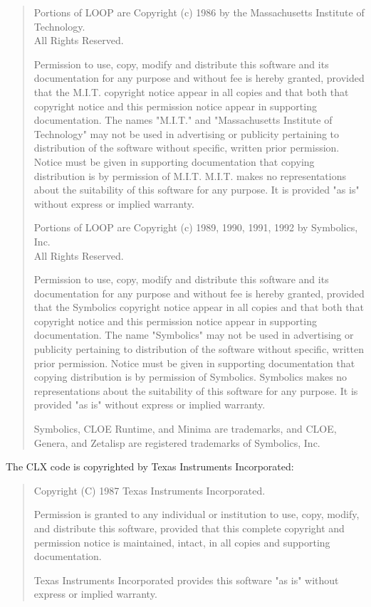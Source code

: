 \begin{quotation}
\noindent Portions of LOOP are Copyright (c) 1986 by the Massachusetts
Institute of Technology.\\
All Rights Reserved.

\vspace{1ex}
\noindent Permission to use, copy, modify and distribute this software
and its documentation for any purpose and without fee is hereby granted,
provided that the M.I.T. copyright notice appear in all copies and that
both that copyright notice and this permission notice appear in
supporting documentation.  The names "M.I.T." and "Massachusetts
Institute of Technology" may not be used in advertising or publicity
pertaining to distribution of the software without specific, written
prior permission.  Notice must be given in supporting documentation that
copying distribution is by permission of M.I.T.  M.I.T. makes no
representations about the suitability of this software for any purpose.
It is provided "as is" without express or implied warranty.

\vspace{3ex}
\noindent Portions of LOOP are Copyright (c) 1989, 1990, 1991, 1992 by
Symbolics, Inc.\\
All Rights Reserved.

\vspace{1ex}
\noindent Permission to use, copy, modify and distribute this software
and its documentation for any purpose and without fee is hereby
granted, provided that the Symbolics copyright notice appear in all
copies and that both that copyright notice and this permission notice
appear in supporting documentation.  The name "Symbolics" may not be
used in advertising or publicity pertaining to distribution of the
software without specific, written prior permission.  Notice must be
given in supporting documentation that copying distribution is by
permission of Symbolics.  Symbolics makes no representations about the
suitability of this software for any purpose.  It is provided "as is"
without express or implied warranty.

\vspace{1ex}
\noindent Symbolics, CLOE Runtime, and Minima are trademarks, and
CLOE, Genera, and Zetalisp are registered trademarks of Symbolics,
Inc.
\end{quotation}
The CLX code is copyrighted by Texas Instruments Incorporated:
\begin{quotation}
\noindent Copyright (C) 1987 Texas Instruments Incorporated.

\vspace{1ex}
\noindent Permission is granted to any individual or institution to
use, copy, modify, and distribute this software, provided that this
complete copyright and permission notice is maintained, intact, in all
copies and supporting documentation.

\vspace{1ex}
\noindent Texas Instruments Incorporated provides this software "as
is" without express or implied warranty.
\end{quotation}

